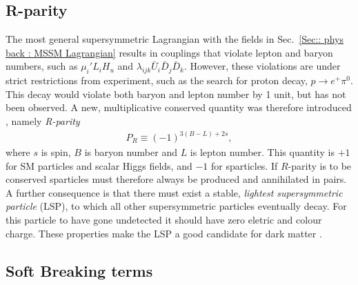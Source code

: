 \documentclass[twoside,english]{uiofysmaster}
\begin{document}
{\subsection{R-parity}\label{Sec:: phys back : R-parity}

The most general supersymmetric Lagrangian with the fields in Sec.~\ref{Sec:: phys back : MSSM Lagrangian} results in couplings that violate lepton and baryon numbers, such as $\mu_i' L_i H_u$ and $ \lambda_{ijk} \bar{U}_i \bar{D}_j \bar{D}_k $. However, these violations are under strict restrictions from experiment, such as the search for proton decay, $p \rightarrow e^+ \pi^0$. This decay would violate both baryon and lepton number by 1 unit, but has not been observed. A new, multiplicative conserved quantity was therefore introduced \cite{farrar1978phenomenology}, namely \textit{R-parity} 
\begin{align}\label{Eq:: R-parity}
P_R \equiv (-1)^{3(B-L) +2s},
\end{align}
where $s$ is spin, $B$ is baryon number and $L$ is lepton number. This quantity is $+1$ for SM particles and scalar Higgs fields, and $-1$ for sparticles. If $R$-parity is to be conserved sparticles must therefore always be produced and annihilated in pairs. A further consequence is that there must exist a stable, \textit{lightest supersymmetric particle} (LSP), to which all other supersymmetric particles eventually decay. For this particle to have gone undetected it should have zero eletric and colour charge. These properties make the LSP a good candidate for dark matter \cite{weinberg_1995}.

\subsection{Soft Breaking terms}\label{Sec:: phys back : Soft breaking terms}

}
\end{document}

